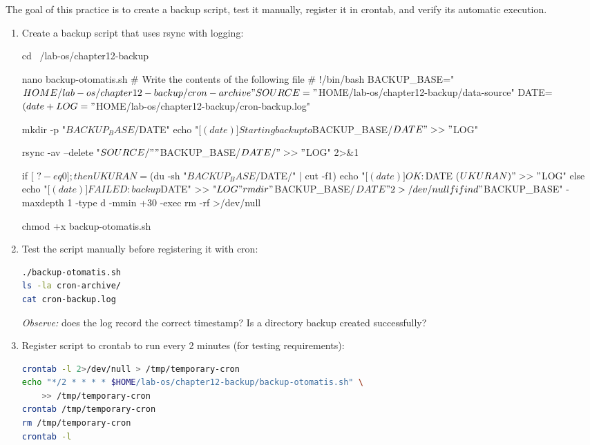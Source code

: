 The goal of this practice is to create a backup script, test it manually, register it in crontab, and verify its automatic execution.

\begin{enumerate}
\item Create a backup script that uses rsync with logging:
\begin{longlisting}[language=bash, caption={Create an automatic backup script}]
cd ~/lab-os/chapter12-backup

nano backup-otomatis.sh
# Write the contents of the following file
# !/bin/bash
BACKUP_BASE="$HOME/lab-os/chapter12-backup/cron-archive"
SOURCE="$HOME/lab-os/chapter12-backup/data-source"
DATE=$(date +%
LOG="$HOME/lab-os/chapter12-backup/cron-backup.log"

mkdir -p "$BACKUP_BASE/$DATE"
echo "[$(date)] Starting backup to $BACKUP_BASE/$DATE" >> "$LOG"

rsync -av --delete "$SOURCE/" "$BACKUP_BASE/$DATE/" >> "$LOG" 2>&1

if [ $? -eq 0 ]; then
    UKURAN=$(du -sh "$BACKUP_BASE/$DATE/" | cut -f1)
    echo "[$(date)] OK: $DATE ($UKURAN)" >> "$LOG"
else
    echo "[$(date)] FAILED: backup $DATE" >> "$LOG"
    rmdir "$BACKUP_BASE/$DATE" 2>/dev/null
fi

find "$BACKUP_BASE" -maxdepth 1 -type d -mmin +30 -exec rm -rf {} >/dev/null

chmod +x backup-otomatis.sh
\end{longlisting}

\item Test the script manually before registering it with cron:
\begin{lstlisting}[language=bash, caption={Test the manual execution of the backup script}]
./backup-otomatis.sh
ls -la cron-archive/
cat cron-backup.log
\end{lstlisting}
\textit{Observe:} does the log record the correct timestamp? Is a directory
backup created successfully?

\item Register script to crontab to run every 2 minutes (for
testing requirements):
\begin{lstlisting}[language=bash, caption={Registering the script to crontab}]
crontab -l 2>/dev/null > /tmp/temporary-cron
echo "*/2 * * * * $HOME/lab-os/chapter12-backup/backup-otomatis.sh" \
    >> /tmp/temporary-cron
crontab /tmp/temporary-cron
rm /tmp/temporary-cron
crontab -l
\end{lstlisting}


\end{enumerate}
